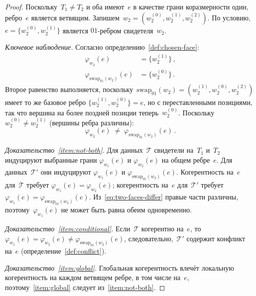 \documentclass[11pt,a4paper]{article}
\theoremstyle{plain}
\theoremstyle{definition}
\theoremstyle{remark}
\newcommand{\cT}{\mathcal{T}}
\newcommand{\swapAB}{\mathrm{swap}_{01}}
\newcommand{\chosenface}{\varphi}
\begin{document}
\begin{proof}
Поскольку~$T_1 \neq T_2$ и оба имеют~$e$ в качестве грани коразмерности
один, ребро~$e$ является ветвящим.
Запишем~$w_2 = (w_2^{(0)}, w_2^{(1)}, w_2^{(2)})$. По условию,
$e = \{w_2^{(0)}, w_2^{(1)}\}$ является $01$-ребром свидетеля~$w_2$.

\medskip\noindent\textit{Ключевое наблюдение.}
Согласно определению~\ref{def:chosen-face}:
\begin{align*}
  \chosenface_{w_2}(e) &= \{w_2^{(1)}\}\,,\\
  \chosenface_{\swapAB(w_2)}(e) &= \{w_2^{(0)}\}\,.
\end{align*}
Второе равенство выполняется, поскольку~$\swapAB(w_2)
= (w_2^{(1)}, w_2^{(0)}, w_2^{(2)})$ имеет то же базовое ребро
$\{w_2^{(1)}, w_2^{(0)}\} = e$, но с переставленными позициями, так что
вершина на более поздней позиции теперь~$w_2^{(0)}$.
Поскольку~$w_2^{(0)} \neq w_2^{(1)}$ (вершины ребра различны):
\begin{equation}
  \label{eq:two-faces-differ}
  \chosenface_{w_2}(e) \;\neq\; \chosenface_{\swapAB(w_2)}(e)\,.
\end{equation}

\medskip\noindent\textit{Доказательство~\ref{item:not-both}.}
Для данных~$\cT$ свидетели на~$T_1$ и~$T_2$ индуцируют выбранные грани
$\chosenface_{w_1}(e)$ и $\chosenface_{w_2}(e)$ на общем ребре~$e$.
Для данных~$\cT'$ они индуцируют $\chosenface_{w_1}(e)$ и
$\chosenface_{\swapAB(w_2)}(e)$.
Когерентность на~$e$ для~$\cT$ требует
$\chosenface_{w_1}(e) = \chosenface_{w_2}(e)$;
когерентность на~$e$ для~$\cT'$ требует
$\chosenface_{w_1}(e) = \chosenface_{\swapAB(w_2)}(e)$.
Из~\eqref{eq:two-faces-differ} правые части различны,
поэтому~$\chosenface_{w_1}(e)$ не может быть равна обеим одновременно.

\medskip\noindent\textit{Доказательство~\ref{item:conditional}.}
Если~$\cT$ когерентно на~$e$, то
$\chosenface_{w_1}(e) = \chosenface_{w_2}(e) \neq
\chosenface_{\swapAB(w_2)}(e)$, следовательно,~$\cT'$ содержит конфликт
на~$e$ (определение~\ref{def:conflict}).

\medskip\noindent\textit{Доказательство~\ref{item:global}.}
Глобальная когерентность влечёт локальную когерентность на каждом ветвящем
ребре, в том числе на~$e$, поэтому~\ref{item:global}
следует из~\ref{item:not-both}.
\end{proof}
\end{document}
